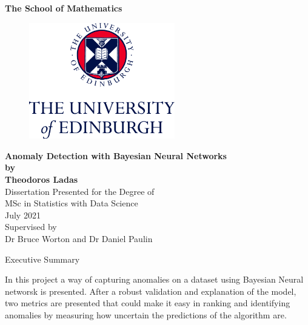 \documentclass[11pt,twoside]{article}
\numberwithin{Theorem}{section}
\numberwithin{Definition}{section}
\numberwithin{Lemma}{section}
\numberwithin{Algorithm}{section}
\numberwithin{equation}{section}
\begin{document}
\pagestyle{empty}

\begin{titlepage}
\vspace*{.5em}
\center
\textbf{\Large{The School of Mathematics}} \\
\vspace*{1em}
\begin{figure}[!h]
\centering
\includegraphics[width=180pt]{CentredLogoCMYK.jpg}
\end{figure}
\vspace{2em}
\textbf{\Huge{Anomaly Detection with Bayesian Neural Networks}}\\[2em]
\textbf{\LARGE{by}}\\
\vspace{2em}
\textbf{\LARGE{Theodoros Ladas}}\\
\vspace{6.5em}
\Large{Dissertation Presented for the Degree of\\
MSc in Statistics with Data Science}\\
\vspace{6.5em}
\Large{July 2021}\\
\vspace{3em}
\Large{Supervised by\\Dr Bruce Worton and Dr Daniel Paulin}
\vfill
\end{titlepage}

\cleardoublepage

\begin{center}
\Large{Executive Summary}
\end{center}

In this project a way of capturing anomalies on a dataset using Bayesian Neural networsk is presented. After a robust validation and explanation of the model, two metrics are presented that could make it easy in ranking and identifying anomalies by measuring how uncertain the predictions of the algorithm are. 
\end{document}
